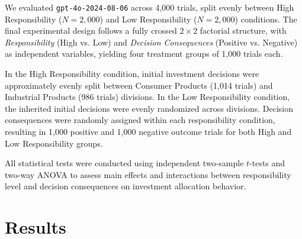 \documentclass{article}
\begin{document}
We evaluated \texttt{gpt-4o-2024-08-06} across 4,000 trials, split evenly between High Responsibility ($N = 2{,}000$) and Low Responsibility ($N = 2{,}000$) conditions. The final experimental design follows a fully crossed $2 \times 2$ factorial structure, with \textit{Responsibility} (High vs. Low) and \textit{Decision Consequences} (Positive vs. Negative) as independent variables, yielding four treatment groups of 1,000 trials each.

In the High Responsibility condition, initial investment decisions were approximately evenly split between Consumer Products (1,014 trials) and Industrial Products (986 trials) divisions. In the Low Responsibility condition, the inherited initial decisions were evenly randomized across divisions. Decision consequences were randomly assigned within each responsibility condition, resulting in 1,000 positive and 1,000 negative outcome trials for both High and Low Responsibility groups.

All statistical tests were conducted using independent two-sample $t$-tests and two-way ANOVA to assess main effects and interactions between responsibility level and decision consequences on investment allocation behavior.

\section{Results}








\end{document}
